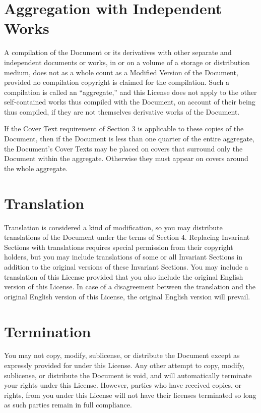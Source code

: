 \section{Aggregation with Independent Works}

A compilation of the Document or its derivatives with other separate
and independent documents or works, in or on a volume of a storage
or distribution medium, does not as a whole count as a Modified Version
of the Document, provided no compilation copyright is claimed for
the compilation. Such a compilation is called an ``aggregate,''
and this License does not apply to the other self-contained works
thus compiled with the Document, on account of their being thus compiled,
if they are not themselves derivative works of the Document.

If the Cover Text requirement of Section 3 is applicable to these
copies of the Document, then if the Document is less than one quarter
of the entire aggregate, the Document's Cover Texts may be placed
on covers that surround only the Document within the aggregate. Otherwise
they must appear on covers around the whole aggregate.

\section{Translation}

Translation is considered a kind of modification, so you may distribute
translations of the Document under the terms of Section 4. Replacing
Invariant Sections with translations requires special permission from
their copyright holders, but you may include translations of some
or all Invariant Sections in addition to the original versions of
these Invariant Sections. You may include a translation of this License
provided that you also include the original English version of this
License. In case of a disagreement between the translation and the
original English version of this License, the original English version
will prevail.

\section{Termination}

You may not copy, modify, sublicense, or distribute the Document except
as expressly provided for under this License. Any other attempt to
copy, modify, sublicense, or distribute the Document is void, and
will automatically terminate your rights under this License. However,
parties who have received copies, or rights, from you under this License
will not have their licenses terminated so long as such parties remain
in full compliance.

